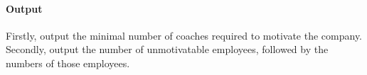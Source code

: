 \paragraph*{Output}

Firstly, output the minimal number of coaches required to motivate the company.
Secondly, output the number of unmotivatable employees, followed by the numbers of those employees.


\begin{samples}
\end{samples}


